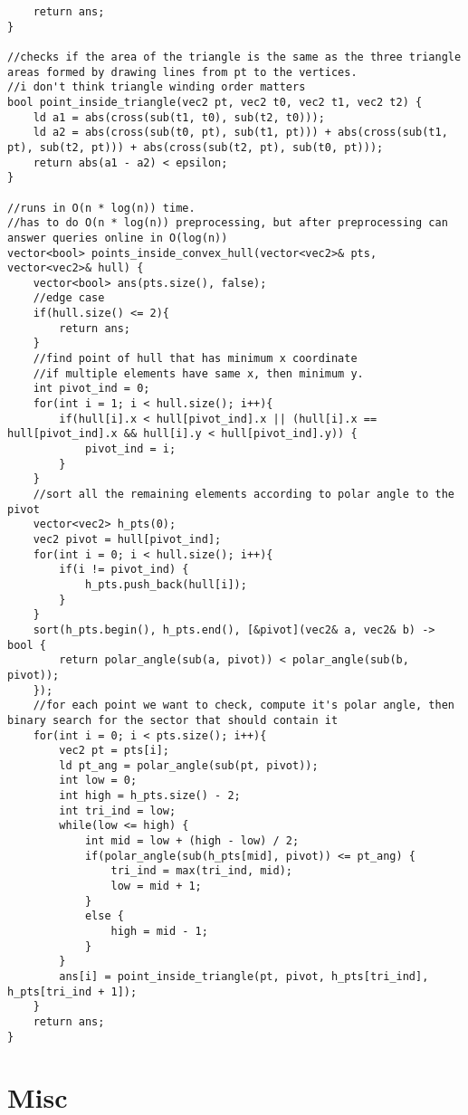 \documentclass[8pt, headheight=10pt, a4paper]{article}
\begin{document}
\begin{multicols*}{3}
\begin{lstlisting}
    return ans;
}

//checks if the area of the triangle is the same as the three triangle areas formed by drawing lines from pt to the vertices. 
//i don't think triangle winding order matters
bool point_inside_triangle(vec2 pt, vec2 t0, vec2 t1, vec2 t2) {
    ld a1 = abs(cross(sub(t1, t0), sub(t2, t0)));
    ld a2 = abs(cross(sub(t0, pt), sub(t1, pt))) + abs(cross(sub(t1, pt), sub(t2, pt))) + abs(cross(sub(t2, pt), sub(t0, pt)));
    return abs(a1 - a2) < epsilon;
}

//runs in O(n * log(n)) time. 
//has to do O(n * log(n)) preprocessing, but after preprocessing can answer queries online in O(log(n))
vector<bool> points_inside_convex_hull(vector<vec2>& pts, vector<vec2>& hull) {
    vector<bool> ans(pts.size(), false);
    //edge case
    if(hull.size() <= 2){
        return ans;
    }
    //find point of hull that has minimum x coordinate
    //if multiple elements have same x, then minimum y. 
    int pivot_ind = 0;
    for(int i = 1; i < hull.size(); i++){
        if(hull[i].x < hull[pivot_ind].x || (hull[i].x == hull[pivot_ind].x && hull[i].y < hull[pivot_ind].y)) {
            pivot_ind = i;
        }
    }
    //sort all the remaining elements according to polar angle to the pivot
    vector<vec2> h_pts(0);
    vec2 pivot = hull[pivot_ind];
    for(int i = 0; i < hull.size(); i++){
        if(i != pivot_ind) {
            h_pts.push_back(hull[i]);
        }
    }
    sort(h_pts.begin(), h_pts.end(), [&pivot](vec2& a, vec2& b) -> bool {
        return polar_angle(sub(a, pivot)) < polar_angle(sub(b, pivot));
    });
    //for each point we want to check, compute it's polar angle, then binary search for the sector that should contain it
    for(int i = 0; i < pts.size(); i++){
        vec2 pt = pts[i];
        ld pt_ang = polar_angle(sub(pt, pivot));
        int low = 0;
        int high = h_pts.size() - 2;
        int tri_ind = low;
        while(low <= high) {
            int mid = low + (high - low) / 2;
            if(polar_angle(sub(h_pts[mid], pivot)) <= pt_ang) {
                tri_ind = max(tri_ind, mid);
                low = mid + 1;
            }
            else {
                high = mid - 1;
            }
        }
        ans[i] = point_inside_triangle(pt, pivot, h_pts[tri_ind], h_pts[tri_ind + 1]);
    }
    return ans;
}

\end{lstlisting}

\section{Misc}

\end{multicols*}
\end{document}
